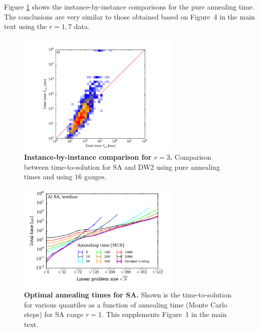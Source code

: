 Figure \ref{fig:ratiosannealingSI3} shows the instance-by-instance comparisons for the pure annealing time. The conclusions are very similar to those obtained based on Figure~4 in the main text using the $r=1,7$ data. \\

\begin{figure}
\centering
\includegraphics[width=0.7\textwidth]{chapters/Speedup/sfigures/sfig06.pdf}
\caption{{\bf Instance-by-instance comparison for $r=3$.} Comparison between time-to-solution for SA and DW2 using pure annealing times and using $16$ gauges. }
\label{fig:ratiosannealingSI3}
\end{figure}


\begin{figure}
\centering
\includegraphics[width=0.7\textwidth]{chapters/Speedup/sfigures/sfig02_leftover.pdf}
\caption{{\bf Optimal annealing times for SA.} Shown is the time-to-solution for various quantiles as a function of annealing time (Monte Carlo steps) for SA range $r=1$. This supplements Figure~1 in the main text.}
\label{fig:leftover02}
\end{figure}


\clearpage

% 
% 



% 
